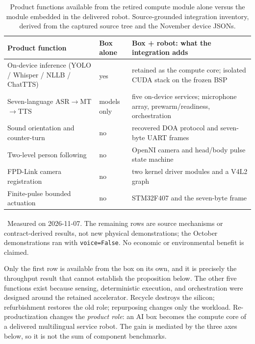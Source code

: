 \documentclass[conference]{IEEEtran}
\newcommand{\code}[1]{\texttt{#1}}
\newcommand{\histnote}{\textsuperscript{\dag}}
\begin{document}
\begin{table}[t]
\centering
\caption{Product functions available from the retired compute module alone versus the module embedded in the delivered robot. Source-grounded integration inventory, derived from the captured source tree and the November device JSONs.}
\label{tab:integration}
\footnotesize
\begin{tabularx}{\columnwidth}{@{}p{34mm}p{16mm}Y@{}}
\toprule
Product function & Box alone & Box + robot: what the integration adds\\
\midrule
On-device inference (YOLO / Whisper / NLLB / ChatTTS) & yes\histnote & retained as the compute core; isolated CUDA stack on the frozen BSP\\
Seven-language ASR$\to$MT$\to$TTS & models only & five on-device services; microphone array, prewarm/readiness, orchestration\\
Sound orientation and counter-turn & no & recovered DOA protocol and seven-byte UART frames\\
Two-level person following & no & OpenNI camera and head/body pulse state machine\\
FPD-Link camera registration & no & two kernel driver modules and a V4L2 graph\\
Finite-pulse bounded actuation & no & STM32F407 and the seven-byte frame\\
\bottomrule
\end{tabularx}
\vspace{2pt}
\begin{flushleft}
\footnotesize \histnote~Measured on 2026-11-07. The remaining rows are source mechanisms or contract-derived results, not new physical demonstrations; the October demonstrations ran with \code{voice=False}. No economic or environmental benefit is claimed.
\end{flushleft}
\end{table}

Only the first row is available from the box on its own, and it is precisely the throughput result that cannot establish the proposition below. The other five functions exist because sensing, deterministic execution, and orchestration were designed around the retained accelerator. Recycle destroys the silicon; refurbishment restores the old role; repurposing changes only the workload. Re-productization changes the \emph{product role}: an AI box becomes the compute core of a delivered multilingual service robot. The gain is mediated by the three axes below, so it is not the sum of component benchmarks.
\end{document}
